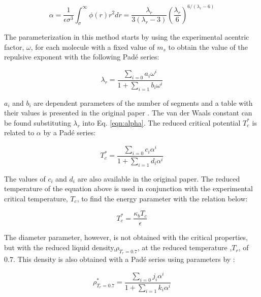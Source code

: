 	\begin{equation}
	\alpha = \frac{1}{\epsilon\sigma^{3	}} \int_{\sigma}^{\infty} \phi(r)r^{2}dr = \frac{\lambda_{r}}{3(\lambda_{r}-3)}\left(\frac{\lambda_r}{6}\right)^{6/(\lambda_{r} - 6)}  
	\label{eqn:alpha}
	\end{equation}
	
	The parameterization in this method starts by using the experimental acentric factor, $\omega$, for each molecule with a fixed value of $ m_{s}$ to obtain the value of the repulsive exponent with the following Padé series:
	
	\begin{equation}
	\lambda_{r} = \frac{\sum_{i=0} a_{i}\omega^{i}}{1+\sum_{i=1} b_{i}\omega^{i}}   
	\label{eqn:lambdaco}
	\end{equation}
	
	$a_{i}$ and $b_{i}$ are dependent parameters of the number of segments and a table with their values is presented in the original paper \cite{mejia2014}. The van der Waals constant can be found substituting $\lambda_{r}$ into Eq. \eqref{eqn:alpha}. The reduced critical potential $T_{c}^{*}$ is related to $\alpha$ by a Padé series: 
	
	\begin{equation}
	T_{c}^{*} = \frac{\sum_{i=0} c_{i}\alpha^{i}}{1+\sum_{i=1} d_{i}\alpha^{i}}   
	\label{eqn:tc}
	\end{equation}
	
	The values of $c_{i}$ and $d_{i}$ are also available in the original paper. The reduced temperature of the equation above is used in conjunction with the experimental critical temperature, $ T_{c}$, to find the energy parameter with the relation below:
	
	\begin{equation}
	T_{c}^{*} = \frac{\kappa_{b}T_{c}}{\epsilon}   
	\label{eqn:epscorre}
	\end{equation}
	
	The diameter parameter, however, is not obtained with the critical properties, but with the reduced liquid density,$\rho_{T_{r}=0.7}$, at the reduced temperature ,$T_{r}$, of $0.7$. This density is also obtained with a Padé series using parameters by :
	
	\begin{equation}
	\rho_{T_{r}=0.7}^{*} = \frac{\sum_{i=0} j_{i}\alpha^{i}}{1+\sum_{i=1} k_{i}\alpha^{i}} 
	\label{eqn:denscorre}
	\end{equation}
	
